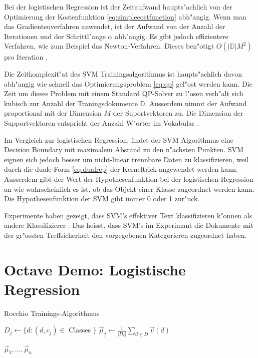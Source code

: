\documentclass[12pt,a4paper,twoside]{article}
\begin{document}
Bei der logistischen Regression ist der Zeitaufwand haupts"achlich von der Optimierung der Kostenfunktion \ref{eq:simplecostfunction} abh"angig. Wenn man das Gradientenverfahren anwendet, ist der Aufwand von der Anzahl der Iterationen und der Schrittl"ange $\alpha$ abh"angig. Es gibt jedoch effizientere Verfahren, wie zum Beispiel das Newton-Verfahren. Dieses ben"otigt $O(|\mathbb{D}| M^2)$ pro Iteration \cite{minka03}.

Die Zeitkomplexit"at des SVM Trainingsalgorithmus ist haupts"achlich davon abh"angig wie schnell das Optimierungsproblem \ref{eq:qp} gel"ost werden kann. Die Zeit um dieses Problem mit einem Standard QP-Solver zu l"osen verh"alt sich kubisch zur Anzahl der Traningsdokumente $\mathbb{D}$. Ausserdem nimmt der Aufwand proportional mit der Dimension $M$ der Suportvektoren zu. Die Dimension der Supportvektoren entspricht der Anzahl W"orter im Vokabular \cite{manning08}. 

Im Vergleich zur logistischen Regression, findet der SVM Algorithmus eine Decision Boundary mit maximalem Abstand zu den n"achsten Punkten. SVM eignen sich jedoch besser um nicht-linear trennbare Daten zu klassifizieren, weil durch die duale Form \ref{eq:dualrep} der Kerneltrick angewendet werden kann. Ausserdem gibt der Wert der Hypothesenfunktion bei der logistischen Regression an wie wahrscheinlich es ist, ob das Objekt einer Klasse zugeordnet werden kann. Die Hypothesenfunktion der SVM gibt immer 0 oder 1 zur"uck.

Experimente haben gezeigt, dass SVM's effektiver Text klassifizieren k"onnen als andere Klassifizierer \cite{manning08}. Das heisst, dass SVM's im Experimant die Dokumente mit der gr"ossten Treffsicherheit den vorgegebenen Kategorieren zugeordnet haben.


\appendix

\section{Octave Demo: Logistische Regression}
\label{sec:code}

\begin{algorithm}
\caption{Rocchio Trainings-Algorithmus}
\begin{algorithmic}

\State $ D_j \gets  \{d : (d,c_j) \in$ Classes $\}$
\State  $\vec \mu_j \gets \frac{1}{|D_c|} \sum_{d \in D} \vec v (d)$
\EndFor

\Return ${\vec \mu_1, \dots , \vec \mu_n }$    
 \end{algorithmic}  
\end{algorithm}
\end{document}
